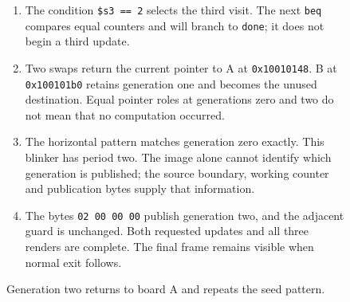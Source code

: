 \begin{figure}[htbp]
  \par\smallskip
  \begin{minipage}{\linewidth}
    \small
    \begin{enumerate}
      \item The condition \texttt{\$s3 == 2} selects the third visit. The next \texttt{beq} compares equal counters and will branch to \texttt{done}; it does not begin a third update.
      \item Two swaps return the current pointer to A at \texttt{0x10010148}. B at \texttt{0x100101b0} retains generation one and becomes the unused destination. Equal pointer roles at generations zero and two do not mean that no computation occurred.
      \item The horizontal pattern matches generation zero exactly. This blinker has period two. The image alone cannot identify which generation is published; the source boundary, working counter and publication bytes supply that information.
      \item The bytes \texttt{02 00 00 00} publish generation two, and the adjacent guard is unchanged. Both requested updates and all three renders are complete. The final frame remains visible when normal exit follows.
    \end{enumerate}
  \end{minipage}
  \caption{Generation two returns to board A and repeats the seed pattern.}
  \label{capture:008-life-generations-f04-two}
\end{figure}
\par
